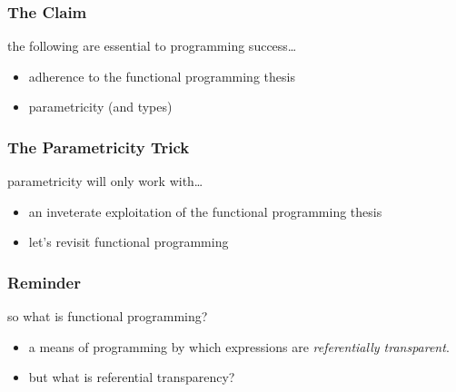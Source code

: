\begin{frame}
\frametitle{The Claim}
\begin{block}{the following are essential to programming success\ldots}
\begin{itemize}
\item<1-> adherence to the functional programming thesis
\item<2-> parametricity (and types)
\end{itemize}
\end{block}
\end{frame}

\begin{frame}[fragile]
\frametitle{The Parametricity Trick}
\begin{block}{parametricity will only work with\ldots}
\begin{itemize}
\item<1-> an inveterate exploitation of the functional programming thesis
\item<2-> let's revisit functional programming
\end{itemize}
\end{block}
\end{frame}

\begin{frame}
\frametitle{Reminder}
\begin{block}{so what is functional programming?}
\begin{itemize}
\item<1-> a means of programming by which expressions are \emph{referentially transparent}.
\item<2-> but what is referential transparency?
\end{itemize}
\end{block}
\end{frame}

